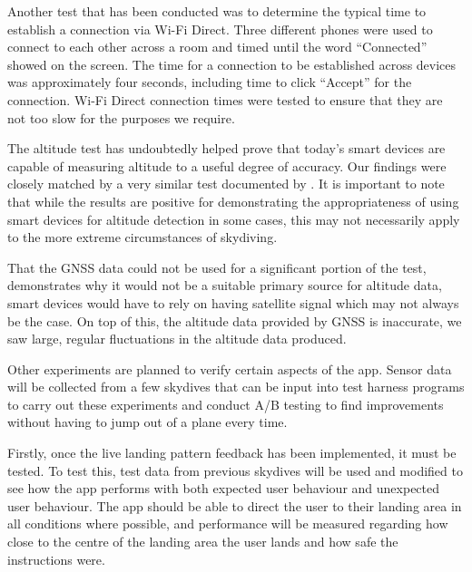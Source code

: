 \documentclass[11pt, a4paper, twocolumn]{article}
\begin{document}
Another test that has been conducted was to determine the typical time to establish a connection via Wi-Fi Direct. Three different phones were used to connect to each other across a room and timed until the word ``Connected'' showed on the screen. The time for a connection to be established across devices was approximately four seconds, including time to click ``Accept'' for the connection. Wi-Fi Direct connection times were tested to ensure that they are not too slow for the purposes we require.

The altitude test has undoubtedly helped prove that today's smart devices are capable of measuring altitude to a useful degree of accuracy. Our findings were closely matched by a very similar test documented by \textcite{he_atmospheric_2012}. It is important to note that while the results are positive for demonstrating the appropriateness of using smart devices for altitude detection in some cases, this may not necessarily apply to the more extreme circumstances of skydiving.

That the GNSS data could not be used for a significant portion of the test, demonstrates why it would not be a suitable primary source for altitude data, smart devices would have to rely on having satellite signal which may not always be the case. On top of this, the altitude data provided by GNSS is inaccurate, we saw large, regular fluctuations in the altitude data produced.

Other experiments are planned to verify certain aspects of the app. Sensor data will be collected from a few skydives that can be input into test harness programs to carry out these experiments and conduct A/B testing to find improvements without having to jump out of a plane every time.

Firstly, once the live landing pattern feedback has been implemented, it must be tested. To test this, test data from previous skydives will be used and modified to see how the app performs with both expected user behaviour and unexpected user behaviour. The app should be able to direct the user to their landing area in all conditions where possible, and performance will be measured regarding how close to the centre of the landing area the user lands and how safe the instructions were.
\end{document}
